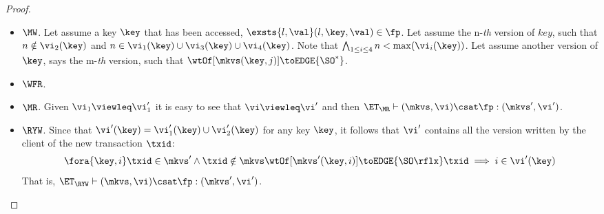 \begin{proof}
\begin{itemize}
    \item \( \MW \).
        Let assume a key \( \key \) that has been accessed, \ie \( \exsts{l,\val} (l,\key,\val) \in \fp \).
        Let assume the n-\emph{th} version of \( key \), such that \( n \notin \vi_2(\key) \) and \( n \in \vi_1(\key) \cup \vi_3(\key) \cup \vi_4(\key) \).
        Note that \( \bigwedge_{1 \leq i \leq 4} n < \max(\vi_i(\key))\).
        Let assume another version of \( \key \), says the m-\emph{th} version, such that \( \wtOf[\mkvs(\key,j)] \toEDGE{\SO^*} \).
    \item \( \WFR \).
    \item \( \MR \). Given \( \vi_1 \viewleq \vi'_1 \) it is easy to see that \( \vi \viewleq \vi' \) and then \( \ET_\MR \vdash (\mkvs,\vi) \csat \fp : (\mkvs',\vi') \).
    \item \( \RYW \). 
    Since that \( \vi'(\key) = \vi'_1(\key) \cup \vi'_2(\key) \) for any key \(\key\), 
    it follows that \( \vi' \) contains all the version written by the client of the new transaction \( \txid \):
    \[
        \fora{\key,i} \txid \in \mkvs' \land \txid \notin \mkvs \wtOf[\mkvs'(\key,i)] \toEDGE{\SO\rflx} \txid \implies i \in \vi'(\key)
    \]
    That is, \( \ET_\RYW \vdash (\mkvs,\vi) \csat \fp : (\mkvs',\vi') \).

\end{itemize}
\end{proof}

